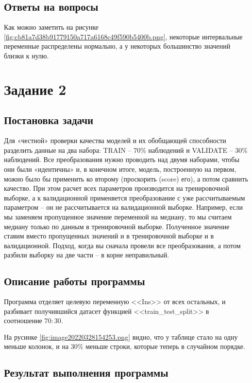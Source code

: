 \documentclass[12pt,a4paper]{article}
\begin{document}
  \subsection{Ответы на вопросы}
  Как можно заметить на рисунке \ref{fig:cb81a7d38b91779150a717a6168c49f590b5400b.png},
  некоторые интервальные переменные распределены нормально, а у некоторых большинство значений близки к нулю.

  \newpage
  \section{Задание 2}
  \subsection{Постановка задачи}
  Для «честной» проверки качества моделей и их обобщающей способности
  разделить данные на два набора: TRAIN -- 70\% наблюдений и VALIDATE --
  30\% наблюдений. Все преобразования нужно проводить
  над двумя наборами, чтобы они были «идентичны» и, в конечном итоге,
  модель, построенную на первом, можно было бы применить ко второму
  (проскорить (score) его), а потом сравнить качество. При этом расчет
  всех параметров производится на тренировочной выборке, а к валидационной
  применяется преобразование с уже рассчитываемым параметром -- он не
  рассчитывается на валидационной выборке. Например, если мы заменяем
  пропущенное значение переменной на медиану, то мы считаем медиану только
  по данным в тренировочной выборке. Полученное значение ставим вместо
  пропущенных значений и в тренировочной выборке и в валидационной.
  Подход, когда вы сначала провели все преобразования, а потом разбили
  выборку на две части -- в корне неправильный.


  \subsection{Описание работы программы}
  Программа отделяет целевую переменную <<Ins>> от всех остальных,
  и разбивает получившийся датасет функцией <<train\_test\_split>>
  в соотношение $70:30$.

  На русинке \ref{fig:image20220328154253.png} видно, что у таблице стало на одну меньше колонок,
  и на 30\% меньше строки, которые теперь в случайном порядке.

  \subsection{Результат выполнения программы}
\end{document}
